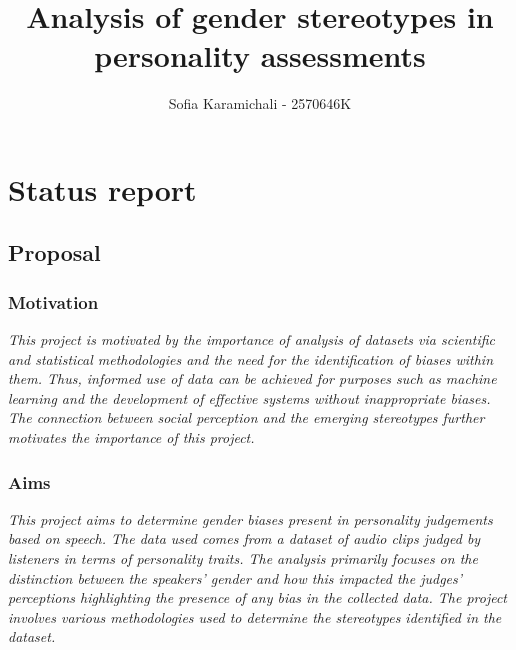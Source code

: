 \documentclass[11pt]{article}
\title{Analysis of gender stereotypes in personality assessments}
\author{Sofia Karamichali - 2570646K}
\begin{document}
    \maketitle
    
    
    
\section{Status report}

\subsection{Proposal}\label{proposal}

\subsubsection{Motivation}\label{motivation}

\emph{This project is motivated by the importance of analysis of datasets via scientific and
statistical methodologies and the need for the identification of biases within them. Thus,
informed use of data can be achieved for purposes such as machine learning and the
development of effective systems without inappropriate biases. The connection between
social perception and the emerging stereotypes further motivates the importance of this
project.}

\subsubsection{Aims}\label{aims}

\emph{This project aims to determine gender biases present in personality judgements based on speech.
The data used comes from a dataset of audio clips judged by listeners in terms of
personality traits. The analysis primarily focuses on the distinction between the speakers'
gender and how this impacted the judges’ perceptions highlighting the presence of any bias
in the collected data. The project involves various methodologies used to
determine the stereotypes identified in the dataset.}
\end{document}
